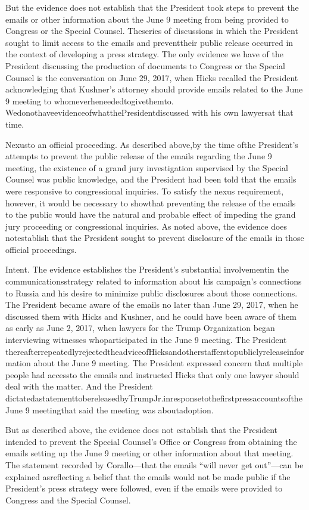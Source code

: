 But the evidence does not establish that the President took steps to prevent the emails or other information about the June 9 meeting from being provided to Congress or the Special Counsel. Theseries of discussions in which the President sought to limit access to the emails and preventtheir public release occurred in the context of developing a press strategy. The only evidence we have of the President discussing the production of documents to Congress or the Special Counsel is the conversation on June 29, 2017, when Hicks recalled the President acknowledging that Kushner’s attorney should provide emails related to the June 9 meeting to whomeverheneededtogivethemto. WedonothaveevidenceofwhatthePresidentdiscussed with his own lawyersat that time.

Nexusto an official proceeding. As described above,by the time ofthe President’s attempts to prevent the public release of the emails regarding the June 9 meeting, the existence of a grand jury investigation supervised by the Special Counsel was public knowledge, and the President had been told that the emails were responsive to congressional inquiries. To satisfy the nexus requirement, however, it would be necessary to showthat preventing the release of the emails to the public would have the natural and probable effect of impeding the grand jury proceeding or congressional inquiries. As noted above, the evidence does notestablish that the President sought to prevent disclosure of the emails in those official proceedings.

Intent. The evidence establishes the President’s substantial involvementin the communicationsstrategy related to information about his campaign’s connections to Russia and his desire to minimize public disclosures about those connections. The President became aware of the emails no later than June 29, 2017, when he discussed them with Hicks and Kushner, and he could have been aware of them as early as June 2, 2017, when lawyers for the Trump Organization began interviewing witnesses whoparticipated in the June 9 meeting. The President thereafterrepeatedlyrejectedtheadviceofHicksandotherstafferstopubliclyreleaseinformation about the June 9 meeting. The President expressed concern that multiple people had accessto the emails and instructed Hicks that only one lawyer should deal with the matter. And the President dictatedastatementtobereleasedbyTrumpJr.inresponsetothefirstpressaccountsoftheJune 9 meetingthat said the meeting was aboutadoption.

But as described above, the evidence does not establish that the President intended to prevent the Special Counsel’s Office or Congress from obtaining the emails setting up the June 9 meeting or other information about that meeting. The statement recorded by Corallo—that the emails “will never get out”—can be explained asreflecting a belief that the emails would not be made public if the President’s press strategy were followed, even if the emails were provided to Congress and the Special Counsel.

